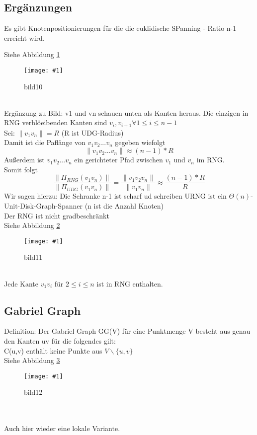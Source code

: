 \documentclass{article}
\newcommand{\bild}[4]{ %
	\begin{figure}[h!]
		\centering
		\texttt{[image: \#1]}
		\caption{#3}
		\label{#4}
	\end{figure}	
}
\newcommand{\sieheBild}[4]{
	Siehe Abbildung \ref{#4}
	\bild{#1}{#2}{#3}{#4}
}
\newcommand{\doubleAbs}[1]{
	\|#1\|
}
\begin{document}
\subsection*{Ergänzungen}
Es gibt Knotenpositionierungen für die die euklidische SPanning - Ratio n-1 erreicht wird.
\sieheBild{Bilder/10.png}{0.4}{bild10}{Bild 10}\\
Ergänzung zu Bild: v1 und vn schauen unten als Kanten heraus.
Die einzigen in RNG verblöeibenden Kanten sind $v_i, v_{i+1} \forall 1 \leq i \leq n-1$\\
Sei: $\doubleAbs{v_1 v_n} = R$ (R ist UDG-Radius)\\
Damit ist die Paflänge von $v_1 v_2 ... v_n$ gegeben wiefolgt
\[
	\doubleAbs{v_1 v_2 ... v_n} \approx (n-1) * R
\]
Außerdem ist $v_1 v_2 ... v_n$ ein gerichteter Pfad zwischen $v_1$ und $v_n$ im RNG.\\
Somit folgt
\[
	\frac{\doubleAbs{\Pi_{RNG}(v_1 v_n)}}{\doubleAbs{\Pi_{UDG}(v_1 v_n)}} = \frac{\doubleAbs{v_1 v_2 v_n}}{\doubleAbs{v_1 v_n}} \approx \frac{(n-1) * R}{R}
\]
Wir sagen hierzu: Die Schranke n-1 ist scharf ud schreiben URNG ist ein $\Theta(n)$-Unit-Disk-Graph-Spanner (n ist die Anzahl Knoten)\\
Der RNG ist nicht gradbeschränkt\\
\sieheBild{Bilder/11.png}{0.4}{bild11}{Bild 11}\\
Jede Kante $v_1 v_i$ für $2 \leq i \leq n$ ist in RNG enthalten.

\subsection*{Gabriel Graph}
Definition: Der Gabriel Graph GG(V) für eine Punktmenge V besteht aus genau den Kanten uv für die folgendes gilt:
\\
C(u,v) enthält keine Punkte aus $V\backslash\{u,v\}$\\
\sieheBild{Bilder/12.png}{0.4}{bild12}{Bild 12}\\
\\
Auch hier wieder eine lokale Variante.\\
\end{document}

